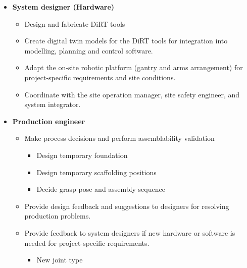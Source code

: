 \begin{itemize}
\begin{itemize}
	\end{itemize}
	\item \textbf{System designer (Hardware)}

	\begin{itemize}
		\item Design and fabricate DiRT tools

		\item Create digital twin models for the DiRT tools for integration into modelling, planning and control software. 

		\item Adapt the on-site robotic platform (gantry and arms arrangement) for project-specific requirements and site conditions. 

		\item Coordinate with the site operation manager, site safety engineer, and system integrator.

	\end{itemize}
	\item \textbf{Production engineer}

	\begin{itemize}
		\item Make process decisions and perform assemblability validation

		\begin{itemize}
			\item Design temporary foundation 

			\item Design temporary scaffolding positions 

			\item Decide grasp pose and assembly sequence 

		\end{itemize}
		\item Provide design feedback and suggestions to designers for resolving production problems.

		\item Provide feedback to system designers if new hardware or software is needed for project-specific requirements.

		\begin{itemize}
			\item New joint type 


\end{itemize}
\end{itemize}
\end{itemize}
